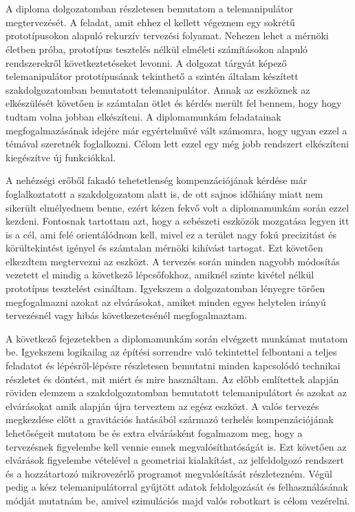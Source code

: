 \chapter{\bevezetes}

A diploma dolgozatomban részletesen bemutatom a telemanipulátor megtervezését. A feladat, amit ehhez el kellett végeznem egy sokrétű prototípusokon alapuló rekurzív tervezési folyamat. Nehezen lehet a mérnöki életben próba, prototípus tesztelés nélkül elméleti számításokon alapuló rendszerekről következtetéseket levonni. A dolgozat tárgyát képező telemanipulátor prototípusának tekinthető a szintén általam készített szakdolgozatomban bemutatott telemanipulátor. Annak az eszköznek az elkészülését követően is számtalan ötlet és kérdés merült fel bennem, hogy hogy tudtam volna jobban elkészíteni. A diplomamunkám feladatainak megfogalmazásának idejére már egyértelművé vált számomra, hogy ugyan ezzel a témával szeretnék foglalkozni. Célom lett ezzel egy még jobb rendszert elkészíteni kiegészítve új funkciókkal.

A nehézségi erőből fakadó tehetetlenség kompenzációjának kérdése már foglalkoztatott a szakdolgozatom alatt is, de ott sajnos időhiány miatt nem sikerült elmélyednem benne, ezért kézen fekvő volt a diplomamunkám során ezzel kezdeni. Fontosnak tartottam azt, hogy a sebészeti eszközök mozgatása legyen itt is a cél, ami felé orientálódnom kell, mivel ez a terület nagy fokú precizitást és körültekintést igényel és számtalan mérnöki kihívást tartogat. Ezt követően elkezdtem megtervezni az eszközt. A tervezés során minden nagyobb módosítás vezetett el mindig a következő lépcsőfokhoz, amiknél szinte kivétel nélkül prototípus tesztelést csináltam. Igyekszem a dolgozatomban lényegre törően megfogalmazni azokat az elvárásokat, amiket minden egyes helytelen irányú tervezésnél vagy hibás következetesénél megfogalmaztam.

A következő fejezetekben a diplomamunkám során elvégzett munkámat mutatom be. Igyekszem logikailag az építési sorrendre való tekintettel felbontani a teljes feladatot és lépésről-lépésre részletesen bemutatni minden kapcsolódó technikai részletet és döntést, mit miért és mire használtam. Az előbb említettek alapján röviden elemzem a szakdolgozatomban bemutatott telemanipulátort és azokat az elvárásokat amik alapján újra terveztem az egész eszközt. A valós tervezés megkezdése előtt a gravitációs hatásából származó terhelés kompenzációjának lehetőségeit mutatom be és extra elvárásként fogalmazom meg, hogy a tervezésnek figyelembe kell vennie ennek megvalósíthatóságát is. Ezt követően az elvárások figyelembe vételével a geometriai kialakítást, az jelfeldolgozó rendszert és a hozzátartozó mikrovezérlő programot megvalósítását részletezném. Végül pedig a kész telemanipulátorral gyűjtött adatok feldolgozását és felhasználásának módját mutatnám be, amivel szimulációs majd valós robotkart is célom vezérelni.
